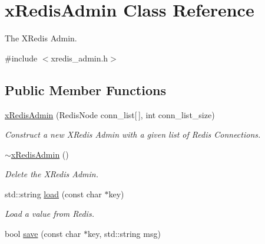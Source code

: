 \hypertarget{classxRedisAdmin}{\section{x\-Redis\-Admin Class Reference}
\label{classxRedisAdmin}
}


The X\-Redis Admin.  




{\ttfamily \#include $<$xredis\-\_\-admin.\-h$>$}

\subsection*{Public Member Functions}
\begin{DoxyCompactItemize}
\item 
\hypertarget{classxRedisAdmin_ae59b7611ff2d0cd4549794e4622d1251}{\hyperlink{classxRedisAdmin_ae59b7611ff2d0cd4549794e4622d1251}{x\-Redis\-Admin} (Redis\-Node conn\-\_\-list\mbox{[}$\,$\mbox{]}, int conn\-\_\-list\-\_\-size)}\label{classxRedisAdmin_ae59b7611ff2d0cd4549794e4622d1251}

\begin{DoxyCompactList}\small\item\em Construct a new X\-Redis Admin with a given list of Redis Connections. \end{DoxyCompactList}\item 
\hypertarget{classxRedisAdmin_a06d156c9ba252cbd5bd48d1f199a7e97}{\hyperlink{classxRedisAdmin_a06d156c9ba252cbd5bd48d1f199a7e97}{$\sim$x\-Redis\-Admin} ()}\label{classxRedisAdmin_a06d156c9ba252cbd5bd48d1f199a7e97}

\begin{DoxyCompactList}\small\item\em Delete the X\-Redis Admin. \end{DoxyCompactList}\item 
\hypertarget{classxRedisAdmin_aa19abdf1562f23acd7193756bfbf1c2a}{std\-::string \hyperlink{classxRedisAdmin_aa19abdf1562f23acd7193756bfbf1c2a}{load} (const char $\ast$key)}\label{classxRedisAdmin_aa19abdf1562f23acd7193756bfbf1c2a}

\begin{DoxyCompactList}\small\item\em Load a value from Redis. \end{DoxyCompactList}\item 
\hypertarget{classxRedisAdmin_ab5a36717fae762eeb88213a7fb349c14}{bool \hyperlink{classxRedisAdmin_ab5a36717fae762eeb88213a7fb349c14}{save} (const char $\ast$key, std\-::string msg)}\label{classxRedisAdmin_ab5a36717fae762eeb88213a7fb349c14}


\end{DoxyCompactItemize}
